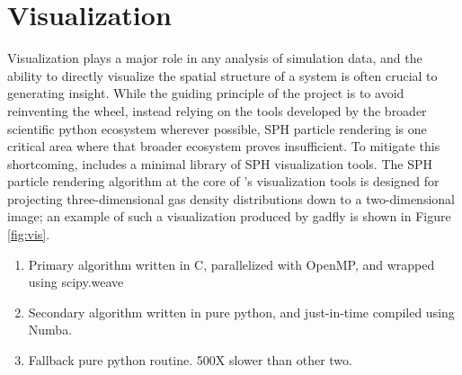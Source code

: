 \section{Visualization}
\label{sec:vis}
Visualization plays a major role in any analysis of simulation data, and the ability to directly visualize the spatial structure of a system is often crucial to generating insight.
While the guiding principle of the  project is to avoid reinventing the wheel, instead relying on the tools developed by the broader scientific python ecosystem wherever possible, SPH particle rendering is one critical area where that broader ecosystem proves insufficient.  
To mitigate this shortcoming,  includes a minimal library of SPH visualization tools.
The SPH particle rendering algorithm at the core of 's visualization tools is designed for projecting three-dimensional gas density distributions down to a two-dimensional image; an example of such a visualization produced by gadfly is shown in Figure \ref{fig:vis}.
\begin{enumerate}
\item Primary algorithm written in C, parallelized with OpenMP, and wrapped using scipy.weave
\item Secondary algorithm written in pure python, and just-in-time compiled using Numba.
\item Fallback pure python routine.  500X slower than other two.
\end{enumerate}